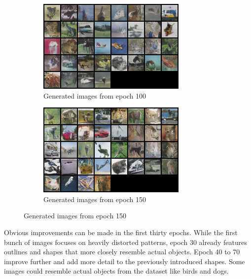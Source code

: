 \begin{figure}[H]
    \centering
    \begin{subfigure}[t]{0.48\textwidth}
        \centering
        \includegraphics[width=\textwidth]{images/ex_2/try_2/epoch_100}
        \caption{Generated images from epoch 100}
    \end{subfigure}
    \begin{subfigure}[t]{0.48\textwidth}
        \centering
        \includegraphics[width=\textwidth]{images/ex_2/try_2/epoch_150}
        \caption{Generated images from epoch 150}
    \end{subfigure}
    \hfill
\end{figure}
Obvious improvements can be made in the first thirty epochs. While the first bunch of images focuses on heavily distorted patterns, epoch 30 already features outlines and shapes that more closely resemble actual objects. 
Epoch 40 to 70 improve further and add more detail to the previously introduced shapes. Some images could resemble actual objects from the dataset like birds and dogs.
